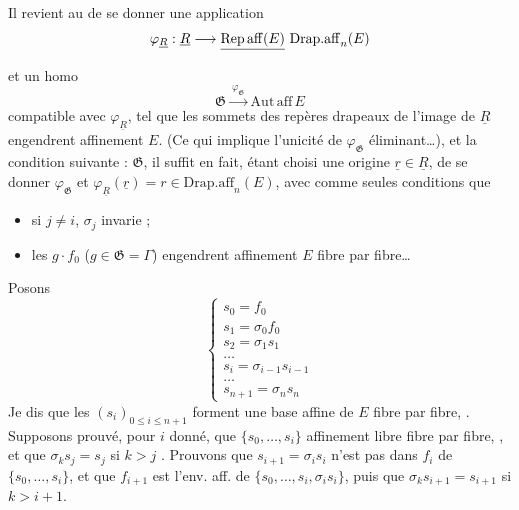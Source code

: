 \documentclass[11pt,a4paper]{article}
\begin{document}
Il revient au  de se donner une application
\[
\varphi_{\underline{R}} : \underline{R} \longrightarrow \struck{\mathrm{Rep\,aff}(E)}\ \mathrm{Drap.aff}_n(E)
\]
  et un homo
\[
\mathfrak{G} \xrightarrow{\ \varphi_{\mathfrak{G}}\ } \mathrm{Aut\,aff}\,E
\]
compatible avec $\varphi_{\underline{R}}$, tel que les sommets des repères drapeaux de l'image de $\underline{R}$ engendrent affinement $E$. (Ce qui implique l'unicité de $\varphi_{\mathfrak{G}}$  \ill{} éliminant\ldots), et la condition suivante :  \ill{} $\mathfrak{G}$, il suffit en fait, étant choisi  une origine $\underline{r}\in\underline{R}$, de se donner $\varphi_{\mathfrak{G}}$ et $\varphi_{\underline{R}}(\underline{r})=r\in\mathrm{Drap.aff}_n(E)$, avec comme seules conditions que
\begin{itemize}
  \item[a)] si $j\neq i$, $\sigma_j$ invarie  ;
  \item[b)] les $g\cdot f_0$ ($g\in\mathfrak{G}=\Gamma$) engendrent affinement $E$ fibre par fibre\ldots
\end{itemize}

Posons
\[
\begin{cases}
s_0 = f_0 \\
s_1 = \sigma_0 f_0 \\
s_2 = \sigma_1 s_1 \\
\dots \\
s_i = \sigma_{i-1} s_{i-1} \\
\dots \\
s_{n+1} = \sigma_n s_n
\end{cases}
\]
Je dis que les $(s_i)_{0\leq i\leq n+1}$ forment une base affine de $E$ fibre par fibre,  \struck{\ill{}}. Supposons prouvé, pour $i$ donné,  que $\{s_0,\dots,s_i\}$  affinement libre fibre par fibre, ,  et que $\sigma_k s_j=s_j$ si  $k>j$ . Prouvons que $s_{i+1}=\sigma_i s_i$ n'est pas dans  $f_i$ de $\{s_0,\dots,s_i\}$, et que $f_{i+1}$ est l'env. aff. de $\{s_0,\dots,s_i,\sigma_i s_i\}$, puis que $\sigma_k s_{i+1}=s_{i+1}$ si $k>i+1$.
\end{document}
